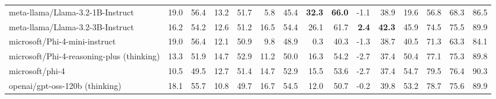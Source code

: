 \documentclass{article}
\begin{document}
\begin{table}[htbp]
\begin{threeparttable}
\begin{adjustbox}{max width=\textwidth}
\begin{tabular}{lrrrrrrrrrrrrrr}
meta-llama/Llama-3.2-1B-Instruct & \cellcolor[HTML]{FFFFFF}19.0 & \cellcolor[HTML]{F7FAFC}56.4 & \cellcolor[HTML]{CFE5F0}13.2 & \cellcolor[HTML]{CCE4EF}51.7 & \cellcolor[HTML]{F6BCA2}5.8 & \cellcolor[HTML]{F7C0A8}45.4 & \cellcolor[HTML]{92C5DE}\textbf{32.3} & \cellcolor[HTML]{92C5DE}\textbf{66.0} & \cellcolor[HTML]{F2F8FB}-1.1 & \cellcolor[HTML]{F0F7FA}38.9 & \cellcolor[HTML]{F5B294}19.6 & \cellcolor[HTML]{F6B79C}56.8 & \cellcolor[HTML]{B1D5E7}68.3 & \cellcolor[HTML]{A9D1E5}86.5 \\
meta-llama/Llama-3.2-3B-Instruct & \cellcolor[HTML]{FCEBE4}16.2 & \cellcolor[HTML]{FDF1EC}54.2 & \cellcolor[HTML]{DCECF4}12.6 & \cellcolor[HTML]{DAEBF3}51.2 & \cellcolor[HTML]{FDF4F0}16.5 & \cellcolor[HTML]{FEFCFB}54.4 & \cellcolor[HTML]{AED4E6}26.1 & \cellcolor[HTML]{A8D1E4}61.7 & \cellcolor[HTML]{92C5DE}\textbf{2.4} & \cellcolor[HTML]{92C5DE}\textbf{42.3} & \cellcolor[HTML]{FDF1EB}45.9 & \cellcolor[HTML]{FCFDFE}74.5 & \cellcolor[HTML]{9AC9E0}75.5 & \cellcolor[HTML]{98C8DF}89.9 \\
microsoft/Phi-4-mini-instruct & \cellcolor[HTML]{FFFFFF}19.0 & \cellcolor[HTML]{F7FAFC}56.4 & \cellcolor[HTML]{E7F2F7}12.1 & \cellcolor[HTML]{E4F0F6}50.9 & \cellcolor[HTML]{F9D1BF}9.8 & \cellcolor[HTML]{FAD8C8}48.9 & \cellcolor[HTML]{FADDD0}0.3 & \cellcolor[HTML]{FCE8DF}40.3 & \cellcolor[HTML]{F8FBFD}-1.3 & \cellcolor[HTML]{F6FAFC}38.7 & \cellcolor[HTML]{FBE4DA}40.5 & \cellcolor[HTML]{FDF3EE}71.3 & \cellcolor[HTML]{C1DEEC}63.3 & \cellcolor[HTML]{B5D8E8}84.1 \\
microsoft/Phi-4-reasoning-plus (thinking) & \cellcolor[HTML]{FAD8C9}13.3 & \cellcolor[HTML]{FADDD0}51.9 & \cellcolor[HTML]{ADD3E6}14.7 & \cellcolor[HTML]{ACD2E5}52.9 & \cellcolor[HTML]{FAD8C9}11.2 & \cellcolor[HTML]{FBDFD3}50.0 & \cellcolor[HTML]{DCECF4}16.3 & \cellcolor[HTML]{D0E6F0}54.2 & \cellcolor[HTML]{FBE6DC}-2.7 & \cellcolor[HTML]{FCE8DF}37.4 & \cellcolor[HTML]{FEFBFA}50.4 & \cellcolor[HTML]{EFF6FA}77.1 & \cellcolor[HTML]{9BC9E0}75.3 & \cellcolor[HTML]{98C8E0}89.8 \\
microsoft/phi-4 & \cellcolor[HTML]{F7C5AE}10.5 & \cellcolor[HTML]{F8C9B4}49.5 & \cellcolor[HTML]{D9EBF3}12.7 & \cellcolor[HTML]{D6E9F2}51.4 & \cellcolor[HTML]{FCEAE3}14.7 & \cellcolor[HTML]{FDF2EE}52.9 & \cellcolor[HTML]{E0EEF5}15.5 & \cellcolor[HTML]{D3E7F1}53.6 & \cellcolor[HTML]{FBE6DC}-2.7 & \cellcolor[HTML]{FCE8DF}37.4 & \cellcolor[HTML]{F6FAFC}54.7 & \cellcolor[HTML]{E4F0F6}79.5 & \cellcolor[HTML]{97C8DF}76.4 & \cellcolor[HTML]{96C7DF}90.3 \\
openai/gpt-oss-120b (thinking) & \cellcolor[HTML]{FEF8F6}18.1 & \cellcolor[HTML]{FEFEFE}55.7 & \cellcolor[HTML]{FEF9F7}10.8 & \cellcolor[HTML]{FEFBFA}49.7 & \cellcolor[HTML]{FDF5F1}16.7 & \cellcolor[HTML]{FEFDFD}54.5 & \cellcolor[HTML]{F0F7FA}12.0 & \cellcolor[HTML]{E2EFF6}50.7 & \cellcolor[HTML]{DAEBF4}-0.2 & \cellcolor[HTML]{D8EAF3}39.8 & \cellcolor[HTML]{FAFCFD}53.2 & \cellcolor[HTML]{E8F2F8}78.7 & \cellcolor[HTML]{9AC9E0}75.6 & \cellcolor[HTML]{98C8DF}89.9 \\

\end{tabular}
\end{adjustbox}
\end{threeparttable}
\end{table}
\end{document}
